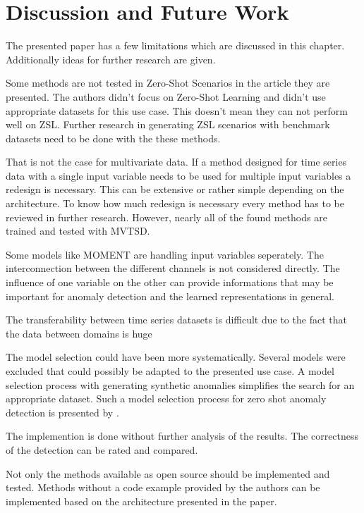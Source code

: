 \section{Discussion and Future Work}\label{discussion}
The presented paper has a few limitations which are discussed in this chapter. Additionally ideas for further research are given.

Some methods are not tested in Zero-Shot Scenarios in the article they are presented. The authors didn't focus on Zero-Shot Learning and didn't use appropriate datasets for this use case.  This doesn't mean they can not perform well on ZSL. Further research in generating ZSL scenarios with benchmark datasets need to be done with the these methods.


That is not the case for multivariate data. If a method designed for time series data with a single input variable needs to be used for multiple input variables a redesign is necessary. This can be extensive or rather simple depending on the architecture. To know how much redesign is necessary every method has to be reviewed in further research. However, nearly all of the found methods are trained and tested with MVTSD.

Some models like MOMENT are handling input variables seperately. The interconnection between the different channels is not considered directly. The influence of one variable on the other can provide informations that may be important for anomaly detection and the learned representations in general.


The transferability between time series datasets is difficult due to the fact that the data between domains is huge \cite{ma_survey_2023}


The model selection could have been more systematically. Several models were excluded that could possibly be adapted to the presented use case. A model selection process with generating synthetic anomalies simplifies the search for an appropriate dataset. Such a model selection process for zero shot anomaly detection is presented by \cite{fung_model_2024}.

The implemention is done without further analysis of the results. The correctness of the detection can be rated and compared.

%
Not only the methods available as open source should be implemented and tested. Methods without a code example provided by the authors can be implemented based on the architecture presented in the paper.
